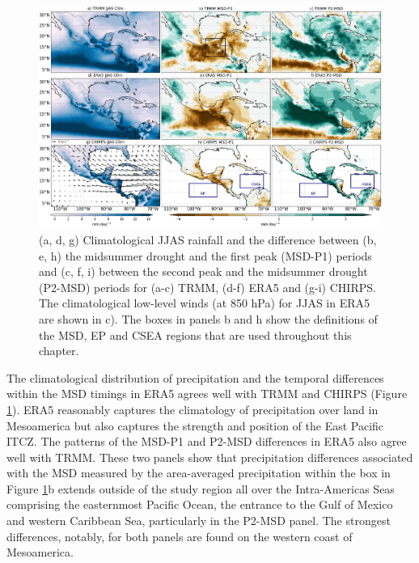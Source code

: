   \begin{figure}[t!]
\includegraphics[width=\linewidth]{figures/fig2obs_prdiff_2.png}
\caption[Observed composites of climatological and seasonal variations of precipitation.]{ (a, d, g) Climatological JJAS rainfall and the difference between  (b, e, h)  the midsummer drought and the first peak (MSD-P1) periods and (c, f, i)  between the second peak and the midsummer drought (P2-MSD) periods for (a-c) TRMM, (d-f) ERA5 and (g-i) CHIRPS. The climatological low-level winds (at 850 hPa) for JJAS in ERA5 are shown in c). The boxes in panels b and h show the definitions of the MSD, EP and CSEA regions that are used throughout this chapter.  }
\label{fig:eof2}
\end{figure} 
 
 The climatological distribution of precipitation and the temporal differences within the MSD timings in ERA5 agrees well with TRMM and CHIRPS (Figure \ref{fig:eof2}). ERA5 reasonably captures the climatology of precipitation over land in Mesoamerica but also captures the strength and position of the East Pacific ITCZ. The patterns of the MSD-P1 and P2-MSD differences in ERA5 also agree well with TRMM. These two panels show that precipitation differences associated with the MSD measured by the area-averaged precipitation within the box in Figure \ref{fig:eof2}b extends outside of the study region all over the Intra-Americas Seas comprising the easternmost Pacific Ocean, the entrance to the Gulf of Mexico and western Caribbean Sea, particularly in the P2-MSD panel. The strongest differences, notably, for both panels are found on the western coast of Mesoamerica. 
 
